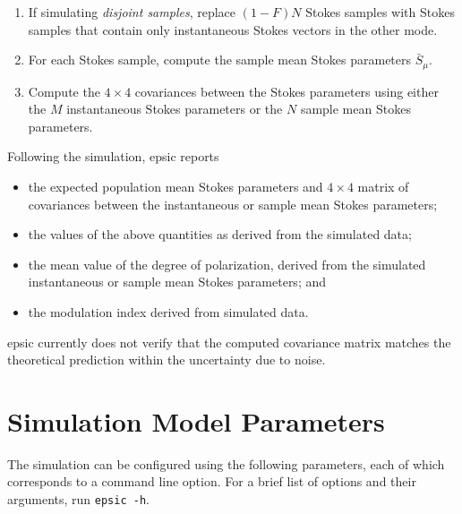 \documentclass[12pt]{article}
\newcommand{\irow}{\mu} \newcommand{\icol}{\nu}
\begin{document}
\begin{enumerate}
\item If simulating \emph{disjoint samples}, replace $(1-F)N$ Stokes
  samples with Stokes samples that contain only instantaneous
  Stokes vectors in the other mode.

\item For each Stokes sample, compute the sample mean Stokes
  parameters $\bar{S}_\irow$.

\item Compute the $4\times4$ covariances between the Stokes parameters
  using either the $M$ instantaneous Stokes parameters or the $N$
  sample mean Stokes parameters.
    
\end{enumerate}
%

Following the simulation, {\sc epsic} reports
\begin{itemize}
  \item the expected population mean Stokes parameters and $4\times4$
    matrix of covariances between the instantaneous or sample mean
    Stokes parameters;

  \item the values of the above quantities as derived from the
    simulated data;

  \item the mean value of the degree of polarization, derived from the
    simulated instantaneous or sample mean Stokes parameters; and

  \item the modulation index derived from simulated data.
\end{itemize}

{\sc epsic} currently does not verify that the computed covariance
matrix matches the theoretical prediction within the uncertainty due
to noise.

\section{ Simulation Model Parameters }

The simulation can be configured using the following parameters, each of
which corresponds to a command line option.  For a brief list of
options and their arguments, run {\tt epsic -h}.
\end{document}
